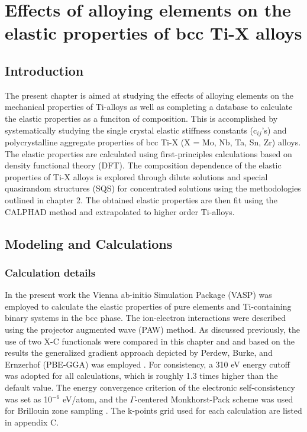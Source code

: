 \chapter{Effects of alloying elements on the elastic properties of bcc Ti-X alloys}

\section{Introduction}

The present chapter is aimed at studying the effects of alloying elements on the mechanical properties of Ti-alloys as well as completing a database to calculate the elastic properties as a funciton of composition. This is accomplished by systematically studying the single crystal elastic stiffness constants (c$_{ij}$'s) and polycrystalline aggregate properties of bcc Ti-X (X = Mo, Nb, Ta, Sn, Zr) alloys. The elastic properties are calculated using first-principles calculations based on density functional theory (DFT). The composition dependence of the elastic properties of Ti-X alloys is explored through dilute solutions and special quasirandom structures (SQS) \cite{Jiang2004} for concentrated solutions using the methodologies outlined in chapter 2. The obtained elastic properties are then fit using the CALPHAD method and extrapolated to higher order Ti-alloys. 

\section{Modeling and Calculations}

\subsection{Calculation details}
In the present work the Vienna ab-initio Simulation Package (VASP) \cite{Kresse1996} was employed to calculate the elastic properties of pure elements and Ti-containing binary systems in the bcc phase. The ion-electron interactions were described using the projector augmented wave (PAW) \cite{Kresse1999,Blochl1994} method. As discussed previously, the use of two X-C functionals were compared in this chapter and and based on the results the generalized gradient approach depicted by Perdew, Burke, and Ernzerhof (PBE-GGA) was employed \cite{Perdew1996a}. For consistency, a 310 eV energy cutoff was adopted for all calculations, which is roughly 1.3 times higher than the default value. The energy convergence criterion of the electronic self-consistency was set as 10$^{-6}$ eV/atom, and the $\Gamma$-centered Monkhorst-Pack scheme was used for Brillouin zone sampling \cite{Kresse1996,Monkhorst1976a}. The k-points grid used for each calculation are listed in appendix C.


